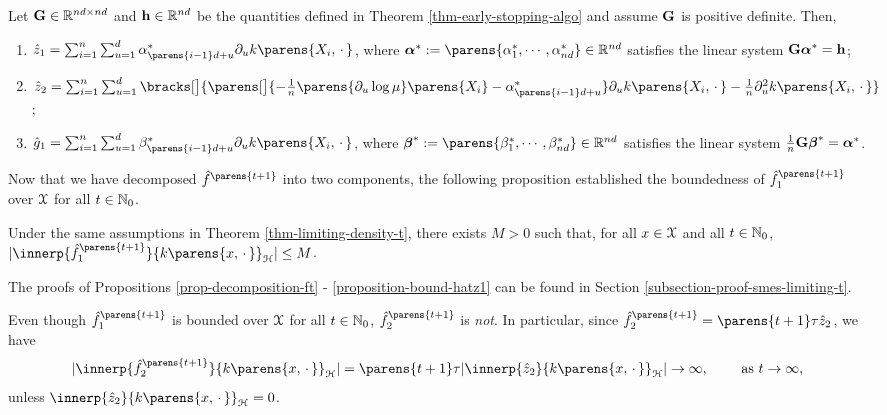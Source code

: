 \begin{proposition}\label{prop-hatz1-hatz2-g1}
	Let $\mathbf{G} \in \mathbb{R}^{nd \times nd}$ and $\mathbf{h} \in \mathbb{R}^{nd}$ be the quantities defined in Theorem \ref{thm-early-stopping-algo} and assume $\mathbf{G}$ is positive definite. Then, 
	\begin{enumerate}[label=(\alph*)]
		\item \label{prop-hatz1-hatz2-g1-1} $\hat{z}_1 = \sum_{i=1}^n \sum_{u=1}^d \alpha^*_{\parens{i-1}d+u} \partial_u k \parens{X_i, \,\cdot\,}$, where $\balpha^* := \parens{\alpha^*_{1}, \cdots, \alpha^*_{nd}} \in \Real^{nd}$ satisfies the linear system $\mathbf{G} \boldsymbol{\alpha}^* = \mathbf{h}$; 
		\item \label{prop-hatz1-hatz2-g1-2} $\hat{z}_2 = \sum_{i=1}^n \sum_{u=1}^d \bracks[\big]{ \parens[\big]{- \frac{1}{n} \parens{\partial_u \log \mu} \parens{X_i} - \alpha^*_{\parens{i-1}d+u}} \partial_u k \parens{X_i, \,\cdot\,} - \frac{1}{n} \partial_u^2 k \parens{X_i, \,\cdot\,}}$; 
		\item \label{prop-hatz1-hatz2-g1-3} $\hat{g}_1 = \sum_{i=1}^n \sum_{u=1}^d \beta^*_{\parens{i-1}d+u} \partial_u k \parens{X_i, \,\cdot\,}$, where $\bbeta^* := \parens{\beta_1^*, \cdots, \beta_{nd}^*} \in \Real^{nd}$ satisfies the linear system $\frac{1}{n} \mathbf{G} \boldsymbol{\beta}^* = \boldsymbol{\alpha}^*$. 
	\end{enumerate}
\end{proposition}

Now that we have decomposed $\hat{f}^{\parens{t+1}}$ into two components, the following proposition established the boundedness of $\hat{f}_1^{\parens{t+1}}$ over $\mathcal{X}$ for all $t \in \mathbb{N}_0$. 

\begin{proposition}\label{proposition-bound-hatz1}
	Under the same assumptions in Theorem \ref{thm-limiting-density-t}, there exists $M > 0$ such that, for all $x \in \mathcal{X}$ and all $t \in \mathbb{N}_0$, $\abs{\innerp{\hat{f}_1^{\parens{t+1}}}{k \parens{x, \,\cdot\,}}_{\calH}} \le M$. 
\end{proposition}

The proofs of Propositions \ref{prop-decomposition-ft} - \ref{proposition-bound-hatz1} can be found in Section \ref{subsection-proof-smes-limiting-t}. 

Even though $\hat{f}_1^{\parens{t+1}}$ is bounded over $\mathcal{X}$ for all $t \in \mathbb{N}_0$, $\hat{f}_2^{\parens{t+1}}$ is \emph{not}. In particular, since $\hat{f}_2^{\parens{t+1}} = \parens{t+1} \tau \hat{z}_2$, we have 
\begin{align*}
	\abs{ \innerp{\hat{f}_2^{\parens{t+1}}}{ k \parens{x, \,\cdot\,}}_{\calH} } = \parens{t+1} \tau \abs{\innerp{\hat{z}_2}{k \parens{x, \,\cdot\,}}_{\calH} } \to \infty, \qquad \text{ as } t \to \infty, 
\end{align*}
unless $\innerp{\hat{z}_2}{k \parens{x, \,\cdot\,}}_{\calH} = 0$. 



